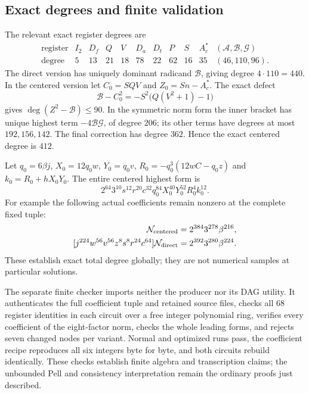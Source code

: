 \subsection{Exact degrees and finite validation}

The relevant exact register degrees are
\[
 \begin{array}{c|rrrrrrrrrr}
 \text{register}&I_2&D_f&Q&V&D_a&D_t&P&S&A_c^{\ast}&
       (\mathcal A,\mathcal B,\mathcal G)\\ \hline
 \text{degree}&5&13&21&18&78&22&62&16&35&(46,110,96).
 \end{array}
\]
The direct version has uniquely dominant radicand $\mathcal B$, giving
degree $4\cdot110=440$. In the centered version let $C_0=SQV$ and
$Z_0=Sn-A_c^{\ast}$. The exact defect
\[
 \mathcal B-C_0^2=-S^2\bigl(Q(V^2+1)-1\bigr)
\]
gives $\deg(Z^2-\mathcal B)\le90$.
In the symmetric norm form the inner bracket has unique highest term
$-4\mathcal B\mathcal G$, of degree $206$; its other terms have
degrees at most $192,156,142$. The final correction has degree $362$.
Hence the exact centered degree is $412$.

Let $q_0=6\beta j$, $X_0=12q_0w$, $Y_0=q_0v$,
$R_0=-q_0^3(12wC-q_0z)$ and $k_0=R_0+hX_0Y_0$.
The entire centered highest form is
\[
 2^{64}3^{10}s^{12}r^{20}c^{32}q_0^{84}X_0^{40}Y_0^{52}R_0^4k_0^{12}.
\]
For example the following actual coefficients remain nonzero at the
complete fixed tuple:
\begin{align*}
 [j^{216}w^{52}v^{64}h^{12}z^4s^{12}r^{20}c^{32}]\mathcal N_{
 \rm centered}&=2^{384}3^{278}\beta^{216},\\
 [j^{224}w^{56}v^{56}z^8s^8r^{24}c^{64}]\mathcal N_{
 \rm direct}&=2^{392}3^{280}\beta^{224}.
\end{align*}
These establish exact total degree globally; they are not numerical
samples at particular solutions.

The separate finite checker imports neither the producer nor its DAG
utility. It authenticates the full coefficient tuple and retained source
files, checks all 68 register identities in each circuit over a free
integer polynomial ring, verifies every coefficient of the eight-factor
norm, checks the whole leading forms, and rejects seven changed nodes per
variant. Normal and optimized runs pass, the coefficient recipe reproduces
all six integers byte for byte, and both circuits rebuild identically.
These checks establish finite algebra and transcription claims; the
unbounded Pell and consistency interpretation remain the ordinary proofs
just described.
